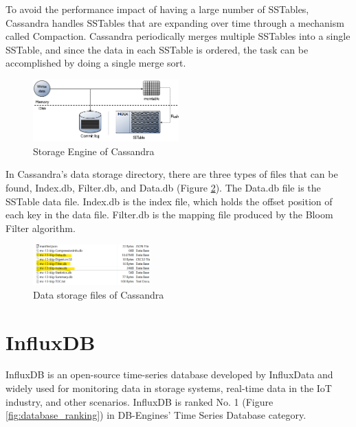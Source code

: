 To avoid the performance impact of having a large number of SSTables, Cassandra handles SSTables that are expanding over time through a mechanism called Compaction.
Cassandra periodically merges multiple SSTables into a single SSTable, and since the data in each SSTable is ordered, the task can be accomplished by doing a single merge sort\cite{compaction_cassandra}.

\begin{figure}[hbt!]
    \centering
    \includegraphics[width=0.5\textwidth]{gfx/cassandra_storage.png}
    \caption{Storage Engine of Cassandra \cite{cassandra_write}}
    \label{fig:storage_cassandra}
\end{figure}

In Cassandra's data storage directory, there are three types of files that can be found, Index.db, Filter.db, and Data.db (Figure \ref{fig:file_cassandra}). The Data.db file is the SSTable data file. Index.db is the index file, which holds the offset position of each key in the data file. Filter.db is the mapping file produced by the Bloom Filter algorithm\cite{compaction_cassandra}.

\begin{figure}[hbt!]
    \centering
    \includegraphics[width=0.4\textwidth]{gfx/file_cassandra.png}
    \caption{Data storage files of Cassandra}
    \label{fig:file_cassandra}
\end{figure}

\section{InfluxDB}
InfluxDB is an open-source time-series database developed by InfluxData and widely used for monitoring data in storage systems, real-time data in the IoT industry, and other scenarios\cite{influxdb_features}. InfluxDB is ranked No. 1 (Figure \ref{fig:database_ranking}) in DB-Engines' Time Series Database category.

